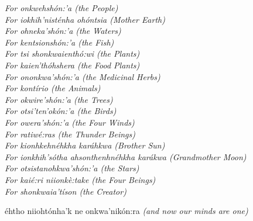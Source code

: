 
\copyrightpage

\begin{dedication}
\setlength{\leftskip}{3cm}
  {\itshape \noindent
    For onkwehsh\'{o}n:'a \emph{(the People)}\\
    For iokhih'nist\'{e}nha oh\'{o}ntsia \emph{(Mother Earth)}\\
    For ohneka'sh\'{o}n:'a \emph{(the Waters)}\\
    For kentsionsh\'{o}n:'a \emph{(the Fish)}\\
    For tsi shonkwaienth\'{o}:wi \emph{(the Plants)}\\
    For kaien'th\'{o}hshera \emph{(the Food Plants)}\\
    For ononkwa'sh\'{o}n:'a \emph{(the Medicinal Herbs)}\\
    For kont\'{i}rio \emph{(the Animals)}\\
    For okwire'sh\'{o}n:'a \emph{(the Trees)}\\
    For otsi'ten'ok\'{o}n:'a \emph{(the Birds)}\\
    For owera'sh\'{o}n:'a \emph{(the Four Winds)}\\
    For ratiw\'{e}:ras \emph{(the Thunder Beings)}\\
    For kionhkehn\'{e}hkha kar\'{a}hkwa \emph{(Brother Sun)}\\
    For ionkhih's\'{o}tha ahsonthenhn\'{e}hkha kar\'{a}kwa \emph{(Grandmother Moon)}\\
    For otsistanohkwa'sh\'{o}n:'a \emph{(the Stars)}\\
    For kai\'{e}:ri niionk\`{e}:take \emph{(the Four Beings)}\\
    For shonkwaia't\'{i}son \emph{(the Creator)}\\
    \begin{center} 
      \'{e}htho niioht\'{o}nha'k ne onkwa'nik\'{o}n:ra \emph{(and now our minds are one)}
    \end{center}
  }
\setlength{\leftskip}{0pt}
\end{dedication}



